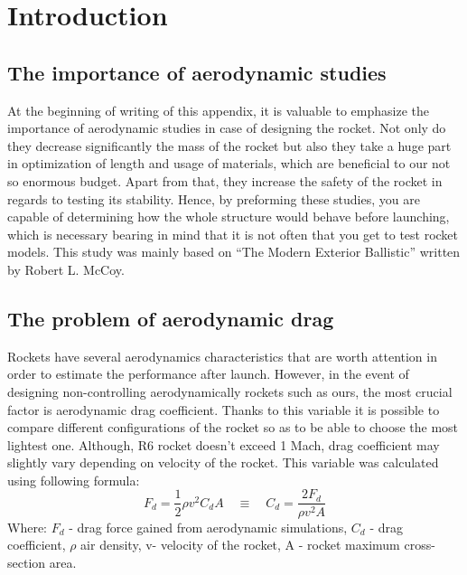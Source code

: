 \documentclass{article}
\begin{document}
\section{Introduction}
\subsection{The importance of aerodynamic studies}
At the beginning of writing of this appendix, it is valuable to emphasize the importance of 
aerodynamic studies in case of designing the rocket.  Not only do they decrease significantly 
the mass of the rocket but also they take a huge part in optimization of length and usage of 
materials, which are beneficial to our not so enormous budget. Apart from that, they increase 
the safety of the rocket in regards to testing its stability. Hence, by preforming these studies, 
you are capable of determining how the whole structure would behave before launching, which is 
necessary bearing in mind that it is not often that you get to test rocket models. This study 
was mainly based on “The Modern Exterior Ballistic” written by Robert L. McCoy.

\subsection{The problem of aerodynamic drag}
Rockets have several aerodynamics characteristics that are worth attention in order to 
estimate the performance after launch. However, in the event of designing non-controlling 
aerodynamically rockets such as ours, the most crucial factor is aerodynamic drag coefficient. 
Thanks to this variable it is possible to compare different configurations of the rocket so as to be able 
to choose the most lightest one. Although, R6 rocket doesn't exceed 1 Mach, drag coefficient 
may slightly vary depending on velocity of the rocket. This variable was calculated 
using following formula:
\begin{equation}
    F_d = \frac{1}{2} \rho v^2 C_d A \quad \equiv \quad C_d = \frac{2F_d}{\rho v^2 A}
\end{equation}
Where: $F_d$ - drag force gained from aerodynamic simulations, $C_d$ - drag coefficient, 
$\rho$ air density, v- velocity of the rocket, A - rocket maximum cross-section area.\\\\
\end{document}
